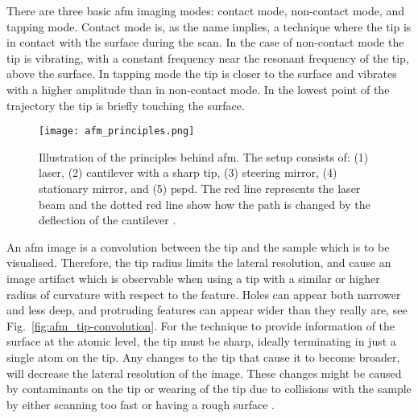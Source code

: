
There are three basic \ac{afm} imaging modes: contact mode, non-contact mode, and tapping mode. Contact mode is, as the name implies, a technique where the tip is in contact with the surface during the scan. In the case of non-contact mode the tip is vibrating, with a constant frequency near the resonant frequency of the tip, above the surface. In tapping mode the tip is closer to the surface and vibrates with a higher amplitude than in non-contact mode. In the lowest point of the trajectory the tip is briefly touching the surface.

\begin{figure}[htbp]
    \centering
    \texttt{[image: afm\_principles.png]}
    \caption[Illustration of the principles behind \ac{afm}.]{Illustration of the principles behind \ac{afm}. The setup consists of: (1) laser, (2) cantilever with a sharp tip, (3) steering mirror, (4) stationary mirror, and (5) \acf{pspd}. The red line represents the laser beam and the dotted red line show how the path is changed by the deflection of the cantilever \citep[Adapted from][]{psia2002xe100}.}
    \label{fig:afm_laser}
\end{figure}

An \ac{afm} image is a convolution between the tip and the sample which is to be visualised. Therefore, the tip radius limits the lateral resolution, and cause an image artifact which is observable when using a tip with a similar or higher radius of curvature with respect to the feature. Holes can appear both narrower and less deep, and protruding features can appear wider than they really are, see Fig.~\ref{fig:afm_tip-convolution}. For the technique to provide information of the surface at the atomic level, the tip must be sharp, ideally terminating in just a single atom on the tip. Any changes to the tip that cause it to become broader, will decrease the lateral resolution of the image. These changes might be caused by contaminants on the tip or wearing of the tip due to collisions with the sample by either scanning too fast or having a rough surface \citep{birdi2003scanning}.

